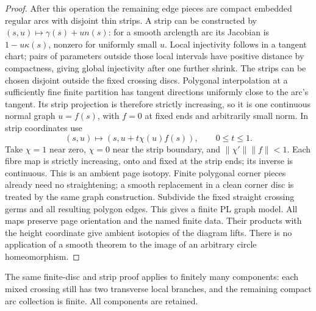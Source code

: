 \begin{proof}
After this operation the remaining edge pieces are compact embedded
regular arcs with disjoint thin strips. A strip can be constructed by
$(s,u)\mapsto\gamma(s)+u n(s)$: for a smooth arclength arc its
Jacobian is $1-u\kappa(s)$, nonzero for uniformly small $u$.
Local injectivity follows in a tangent chart; pairs of parameters outside
those local intervals have positive distance by compactness, giving
global injectivity after one further shrink. The strips can be chosen
disjoint outside the fixed crossing discs. Polygonal interpolation at
a sufficiently fine finite partition has tangent directions uniformly
close to the arc's tangent. Its strip projection is therefore strictly
increasing, so it is one continuous normal graph $u=f(s)$, with $f=0$
at fixed ends and arbitrarily small norm. In strip coordinates use
\begin{equation}\label{eq:gauss-strip-isotopy}
 (s,u)\longmapsto(s,u+t\chi(u)f(s)),\qquad 0\leq t\leq1.
\end{equation}
Take $\chi=1$ near zero, $\chi=0$ near the strip boundary, and
$\|\chi'\|\|f\|<1$. Each fibre map is strictly increasing,
onto and fixed at the strip ends; its inverse is continuous. This is an
ambient page isotopy. Finite polygonal corner pieces already need no
straightening; a smooth replacement in a clean corner disc is treated
by the same graph construction. Subdivide the fixed straight crossing
germs and all resulting polygon edges. This gives a finite PL graph
model. All maps preserve page orientation and the named finite data.
Their products with the height coordinate give ambient isotopies of the
diagram lifts. There is no application of a smooth theorem to the image
of an arbitrary circle homeomorphism.
\end{proof}

The same finite-disc and strip proof applies to finitely many components:
each mixed crossing still has two transverse local branches, and the
remaining compact arc collection is finite. All components are retained.


